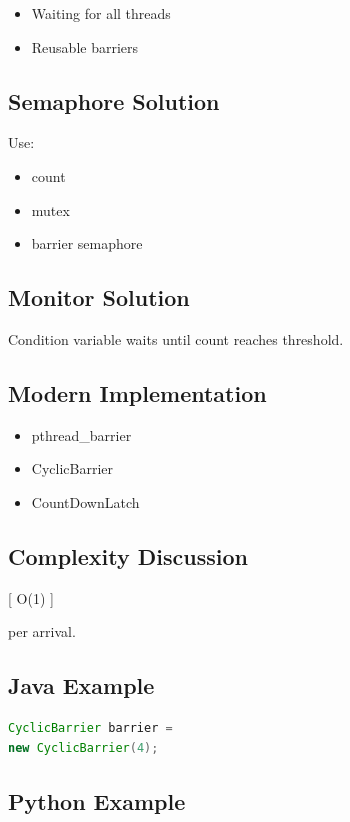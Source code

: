 \begin{itemize}
\item Waiting for all threads
\item Reusable barriers
\end{itemize}

\subsection{Semaphore Solution}

Use:

\begin{itemize}
\item count
\item mutex
\item barrier semaphore
\end{itemize}

\subsection{Monitor Solution}

Condition variable waits until count reaches threshold.

\subsection{Modern Implementation}

\begin{itemize}
\item pthread_barrier
\item CyclicBarrier
\item CountDownLatch
\end{itemize}

\subsection{Complexity Discussion}

[
O(1)
]

per arrival.

\subsection{Java Example}

\begin{lstlisting}[language=Java,style=interviewcode]
CyclicBarrier barrier =
new CyclicBarrier(4);
\end{lstlisting}

\subsection{Python Example}

